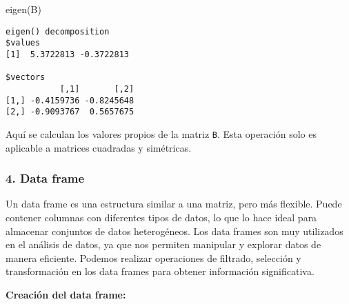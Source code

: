 \documentclass[
  a4paper,
]{article}
\newenvironment{Shaded}{}{}
\newcommand{\FunctionTok}[1]{\textcolor[rgb]{0.44,0.26,0.76}{#1}}
\newcommand{\NormalTok}[1]{\textcolor[rgb]{0.14,0.16,0.18}{#1}}
\begin{document}
\begin{enumerate}
\begin{Shaded}
\begin{Highlighting}[]
\FunctionTok{eigen}\NormalTok{(B)}
\end{Highlighting}
\end{Shaded}

\begin{verbatim}
eigen() decomposition
$values
[1]  5.3722813 -0.3722813

$vectors
           [,1]       [,2]
[1,] -0.4159736 -0.8245648
[2,] -0.9093767  0.5657675
\end{verbatim}

  Aquí se calculan los valores propios de la matriz \texttt{B}. Esta
  operación solo es aplicable a matrices cuadradas y simétricas.
\end{enumerate}

\subsubsection{4. Data frame}\label{data-frame}

Un data frame es una estructura similar a una matriz, pero más flexible.
Puede contener columnas con diferentes tipos de datos, lo que lo hace
ideal para almacenar conjuntos de datos heterogéneos. Los data frames
son muy utilizados en el análisis de datos, ya que nos permiten
manipular y explorar datos de manera eficiente. Podemos realizar
operaciones de filtrado, selección y transformación en los data frames
para obtener información significativa.

\textbf{Creación del data frame:}
\end{document}
